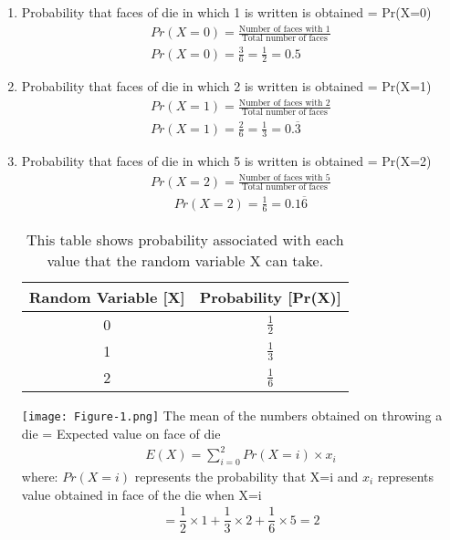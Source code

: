 \documentclass[journal,12pt,twocolumn]{IEEEtran}
\begin{document}
\begin{enumerate}
    
\item Probability that faces of die in which 1 is written is obtained = Pr(X=0)
\begin{align}
    Pr(X=0) = \frac{\text{Number of faces with 1}}{\text{Total number of faces}}\\
    Pr(X=0) = \frac{3}{6} = \frac{1}{2} = 0.5
\end{align}
\item Probability that faces of die in which 2 is written is obtained = Pr(X=1)
\begin{align}
    Pr(X=1) = \frac{\text{Number of faces with 2}}{\text{Total number of faces}}\\
    Pr(X=1) = \frac{2}{6} = \frac{1}{3} = 0.\overline{3}
\end{align}
\item Probability that faces of die in which 5 is written is obtained = Pr(X=2)
\begin{align}
    Pr(X=2) = \frac{\text{Number of faces with 5}}{\text{Total number of faces}}
\end{align}
\begin{align}
    Pr(X=2) = \frac{1}{6} = 0.1\overline{6}
\end{align}
\begin{table}[H]
\centering
\begin{tabular}{|c|c|}
\hline
Random Variable {[}X{]} & Probability {[}Pr(X){]} \\ \hline
0                      & $\frac{1}{2}$                    \\ \hline
1                      & $\frac{1}{3}$                    \\ \hline
2                      & $\frac{1}{6}$                   \\ \hline
\end{tabular}
\caption{This table shows probability associated with each value that the random variable X can take.}
\label{tab:Table 5.10}
\end{table}
\texttt{[image: Figure-1.png]}
The mean of the numbers obtained on throwing
a die = Expected value on face of die
\begin{align}
E(X) = \sum_{i = 0}^{2} Pr(X=i) \times x_{i}
\end{align}
where: $Pr(X=i)$ represents the probability that X=i and $x_{i}$ represents value obtained in face of the die when X=i 
\begin{align}
= \dfrac{1}{2} \times 1 + \dfrac{1}{3} \times 2 + \dfrac{1}{6} \times 5 = 2
\end{align}
\bigskip
{}
\end{enumerate}
\end{document}
